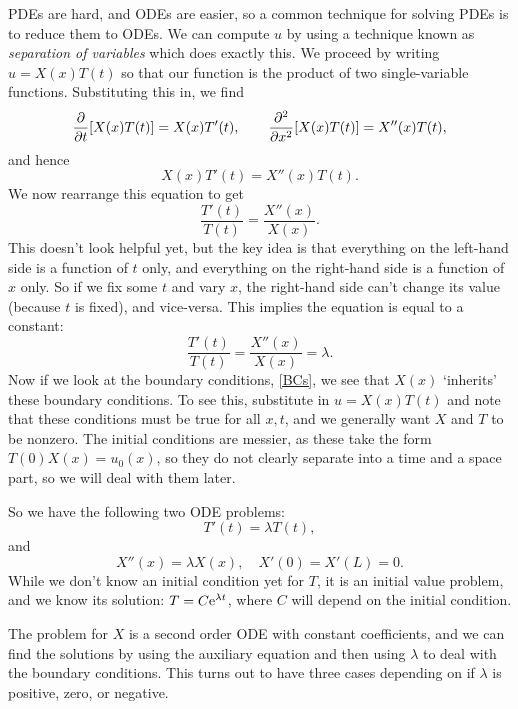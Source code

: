 \documentclass[main.tex]{subfiles}
\begin{document}
PDEs are hard, and ODEs are easier, so a common technique for solving PDEs is to reduce them to ODEs. We can compute $u$ by using a technique known as \emph{separation of variables} which does exactly this. We proceed by writing $u = X(x)T(t)$ so that our function is the product of two single-variable functions. Substituting this in, we find
\begin{equation}
    \pd{}{t}[X(x)T(t)] = X(x)T'(t), \qquad
    \pdd{}{x}[X(x)T(t)] = X''(x)T(t),
\end{equation}
and hence
\begin{equation}
X(x)T'(t) = X''(x)T(t).
\end{equation}
We now rearrange this equation to get
\begin{equation}
    \frac{T'(t)}{T(t)} = \frac{X''(x)}{X(x)}.
\end{equation}
This doesn't look helpful yet, but the key idea is that everything on the left-hand side is a function of $t$ only, and everything on the right-hand side is a function of $x$ only. So if we fix some $t$ and vary $x$, the right-hand side can't change its value (because $t$ is fixed), and vice-versa. This implies the equation is equal to a constant:
\begin{equation}
    \frac{T'(t)}{T(t)} = \frac{X''(x)}{X(x)} = \lambda.
\end{equation}
%
Now if we look at the boundary conditions, \cref{BCs}, we see that $X(x)$ `inherits' these boundary conditions. To see this, substitute in $u = X(x)T(t)$ and note that these conditions must be true for all $x,t$, and we generally want $X$ and $T$ to be nonzero. The initial conditions are messier, as these take the form $T(0)X(x) = u_0(x)$, so they do not clearly separate into a time and a space part, so we will deal with them later.

So we have the following two ODE problems:
\begin{equation}\label{T_eq}
    T'(t) = \lambda T(t),
\end{equation}
and
\begin{equation}\label{X_eq}
    X''(x) = \lambda X(x), \quad X'(0)=X'(L)=0.
\end{equation}
While we don't know an initial condition yet for $T$, it is an initial value problem, and we know its solution: $T = C\mathrm{e}^{\lambda t}$, where $C$ will depend on the initial condition. 

The problem for $X$ is a second order ODE with constant coefficients, and we can find the solutions by using the auxiliary equation and then using $\lambda$ to deal with the boundary conditions. This turns out to have three cases depending on if $\lambda$ is positive, zero, or negative.
\end{document}
